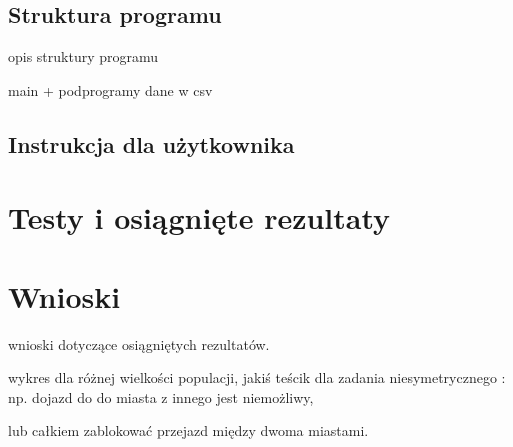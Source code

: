 \documentclass[12pt, oneside, final]{report}
\begin{document}
\subsection{Struktura programu}
opis struktury programu

main + podprogramy
dane w csv

\subsection{Instrukcja dla użytkownika}

\section{Testy i osiągnięte rezultaty}

\section{Wnioski}
wnioski dotyczące osiągniętych rezultatów. 

wykres dla różnej wielkości populacji,
jakiś teścik dla zadania niesymetrycznego : np. dojazd do do miasta z innego jest niemożliwy,

lub całkiem zablokować przejazd między dwoma miastami.
\end{document}
